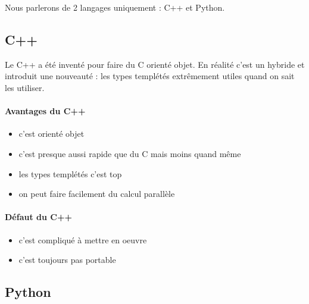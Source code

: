 
Nous parlerons de 2 langages uniquement : C++ et Python. 

\subsection{C++}

Le C++ a été inventé pour faire du C orienté objet. En réalité c'est un hybride et introduit une
nouveauté : les types templétés extrêmement utiles quand on sait les utiliser.


\paragraph{Avantages du C++}

\begin{itemize}
\item c'est orienté objet
\item c'est presque aussi rapide que du C mais moins quand même
\item les types templétés c'est top
\item on peut faire facilement du calcul parallèle %
\end{itemize}

\paragraph{Défaut du C++}

\begin{itemize}
\item c'est compliqué à mettre en oeuvre
\item c'est toujours pas portable %
\end{itemize}

\subsection{Python}

